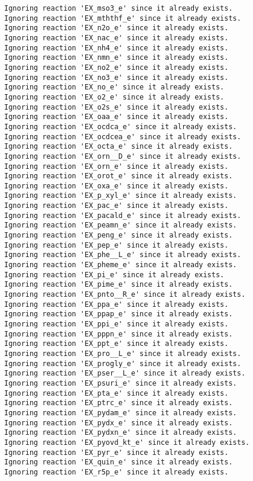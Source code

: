 \documentclass[
  letterpaper,
  DIV=11,
  numbers=noendperiod]{scrartcl}
\begin{document}
\begin{verbatim}
Ignoring reaction 'EX_mso3_e' since it already exists.
Ignoring reaction 'EX_mththf_e' since it already exists.
Ignoring reaction 'EX_n2o_e' since it already exists.
Ignoring reaction 'EX_nac_e' since it already exists.
Ignoring reaction 'EX_nh4_e' since it already exists.
Ignoring reaction 'EX_nmn_e' since it already exists.
Ignoring reaction 'EX_no2_e' since it already exists.
Ignoring reaction 'EX_no3_e' since it already exists.
Ignoring reaction 'EX_no_e' since it already exists.
Ignoring reaction 'EX_o2_e' since it already exists.
Ignoring reaction 'EX_o2s_e' since it already exists.
Ignoring reaction 'EX_oaa_e' since it already exists.
Ignoring reaction 'EX_ocdca_e' since it already exists.
Ignoring reaction 'EX_ocdcea_e' since it already exists.
Ignoring reaction 'EX_octa_e' since it already exists.
Ignoring reaction 'EX_orn__D_e' since it already exists.
Ignoring reaction 'EX_orn_e' since it already exists.
Ignoring reaction 'EX_orot_e' since it already exists.
Ignoring reaction 'EX_oxa_e' since it already exists.
Ignoring reaction 'EX_p_xyl_e' since it already exists.
Ignoring reaction 'EX_pac_e' since it already exists.
Ignoring reaction 'EX_pacald_e' since it already exists.
Ignoring reaction 'EX_peamn_e' since it already exists.
Ignoring reaction 'EX_peng_e' since it already exists.
Ignoring reaction 'EX_pep_e' since it already exists.
Ignoring reaction 'EX_phe__L_e' since it already exists.
Ignoring reaction 'EX_pheme_e' since it already exists.
Ignoring reaction 'EX_pi_e' since it already exists.
Ignoring reaction 'EX_pime_e' since it already exists.
Ignoring reaction 'EX_pnto__R_e' since it already exists.
Ignoring reaction 'EX_ppa_e' since it already exists.
Ignoring reaction 'EX_ppap_e' since it already exists.
Ignoring reaction 'EX_ppi_e' since it already exists.
Ignoring reaction 'EX_pppn_e' since it already exists.
Ignoring reaction 'EX_ppt_e' since it already exists.
Ignoring reaction 'EX_pro__L_e' since it already exists.
Ignoring reaction 'EX_progly_e' since it already exists.
Ignoring reaction 'EX_pser__L_e' since it already exists.
Ignoring reaction 'EX_psuri_e' since it already exists.
Ignoring reaction 'EX_pta_e' since it already exists.
Ignoring reaction 'EX_ptrc_e' since it already exists.
Ignoring reaction 'EX_pydam_e' since it already exists.
Ignoring reaction 'EX_pydx_e' since it already exists.
Ignoring reaction 'EX_pydxn_e' since it already exists.
Ignoring reaction 'EX_pyovd_kt_e' since it already exists.
Ignoring reaction 'EX_pyr_e' since it already exists.
Ignoring reaction 'EX_quin_e' since it already exists.
Ignoring reaction 'EX_r5p_e' since it already exists.

\end{verbatim}
\end{document}
